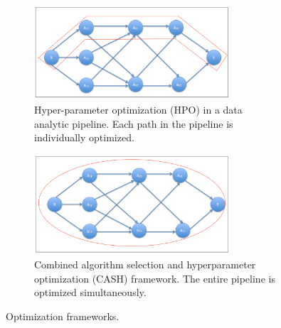 \begin{figure}[ht!]
\begin{adjustbox}{right}
   \begin{subfigure}{\columnwidth}
   \centering
      \includegraphics[width=0.8\textwidth]{img/EP/HPO}
      \caption{Hyper-parameter optimization (HPO) in a data analytic pipeline. Each path in the pipeline is individually optimized.}
      \label{fig:HPO}
   \end{subfigure}
\end{adjustbox}

\begin{adjustbox}{right}
   \begin{subfigure}{\columnwidth}
   \centering
      \includegraphics[width=0.8\textwidth]{img/EP/CASH}
      \caption{Combined algorithm selection and hyperparameter optimization (CASH) framework. The entire pipeline is optimized simultaneously.}
      \label{fig:CASH}
   \end{subfigure}
\end{adjustbox}
\caption{Optimization frameworks.}\label{fig:frameworks}
\end{figure}





